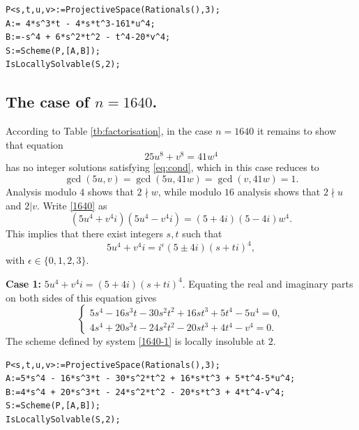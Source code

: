 \documentclass[a4paper,12pt,english,reqno]{amsart}
\begin{document}
\begin{lstlisting}
P<s,t,u,v>:=ProjectiveSpace(Rationals(),3);
A:= 4*s^3*t - 4*s*t^3-161*u^4;
B:=-s^4 + 6*s^2*t^2 - t^4-20*v^4;
S:=Scheme(P,[A,B]);
IsLocallySolvable(S,2);
\end{lstlisting}

\subsection{The case of $n=1640$.}%
According to Table \ref{tb:factorisation}, in the case $n=1640$ it remains to
show that equation
\begin{equation}\label{1640}
25 u^8 + v^8= 41w^4
\end{equation}
has no integer solutions satisfying \eqref{eq:cond}, which in this case reduces to
$$
\gcd(5u,v)=\gcd(5u,41w)=\gcd(v,41w)=1.
$$
Analysis modulo $4$ shows that $2\nmid w$, while modulo $16$ analysis shows that $2\nmid u$ and $2|v$.
Write \eqref{1640} as
\begin{equation} (5u^4+v^4i)(5u^4-v^4i)=(5+4i)(5-4i)w^4.
\end{equation}
This implies that there exist integers $s,t$ such that 
\[5u^4+v^4i=i^{\epsilon}(5\pm 4i)(s+ti)^4,\]
with $\epsilon \in \{0,1,2,3\}$.

{\bf Case 1:} $5u^4+v^4i=(5+4i)(s+ti)^4$. Equating the real and imaginary parts on both sides of this equation gives
\begin{equation}\label{1640-1}
\begin{cases}
5s^4 - 16s^3t - 30s^2t^2 + 16st^3 + 5t^4 - 5u^4=0,\\
4s^4 + 20s^3t - 24s^2t^2 - 20st^3 + 4t^4 - v^4=0.
\end{cases}
\end{equation}
The scheme defined by system \eqref{1640-1} is locally insoluble at $2$.


\begin{lstlisting}
P<s,t,u,v>:=ProjectiveSpace(Rationals(),3);
A:=5*s^4 - 16*s^3*t - 30*s^2*t^2 + 16*s*t^3 + 5*t^4-5*u^4;
B:=4*s^4 + 20*s^3*t - 24*s^2*t^2 - 20*s*t^3 + 4*t^4-v^4;
S:=Scheme(P,[A,B]);
IsLocallySolvable(S,2);
\end{lstlisting}
\end{document}
